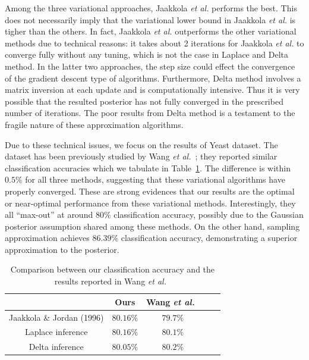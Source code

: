 Among the three variational approaches, Jaakkola {\it et al.} performs the
best. This does not necessarily imply that the variational lower bound in
Jaakkola {\it et al.} is tigher than the others. In fact, Jaakkola {\it et
al.} outperforms the other variational methods due to technical reasons: it
takes about 2 iterations for Jaakkola {\it et al.} to converge fully without
any tuning, which is not the case in Laplace and Delta method. In the latter
two approaches, the step size could effect the convergence of the gradient
descent type of algorithms. Furthermore, Delta method involves a matrix
inversion at each update and is computationally intensive. Thus it is very
possible that the resulted posterior has not fully converged in the prescribed
number of iterations. The poor results from Delta method is a testament to the
fragile nature of these approximation algorithms.

Due to these technical issues, we focus on the results of Yeast dataset. The
dataset has been previously studied by Wang {\it et al.}~\cite{Wang13}; they
reported similar classification accuracies which we tabulate in
Table~\ref{tab:compare_wang}. The difference is within $0.5\%$ for all three
methods, suggesting that these variational algorithms have properly converged.
These are strong evidences that our results are the optimal or near-optimal
performance from these variational methods. Interestingly, they all
``max-out'' at around $80\%$ classification accuracy, possibly due to the
Gaussian posterior assumption shared among these methods. On the other hand,
sampling approximation achieves $86.39\%$ classification accuracy,
demonstrating a superior approximation to the posterior.


\begin{table}
\label{tab:compare_wang}
\begin{center}
\begin{tabular}{| c | c |  c | c | c |}
  \hline
   & Ours  & Wang {\it et al.}~\cite{Wang13} \\
  \hline
  Jaakkola \& Jordan (1996) & $80.16\%$ & $79.7\%$ \\
  \hline
  Laplace inference & $80.16\%$ & $80.1\%$ \\
  \hline
  Delta inference & $80.05\%$ & $80.2\%$ \\
  \hline
\end{tabular}
\end{center}

\caption{Comparison between our classification accuracy and the results
reported in Wang {\it et al.}~\cite{Wang13}}
\end{table}

